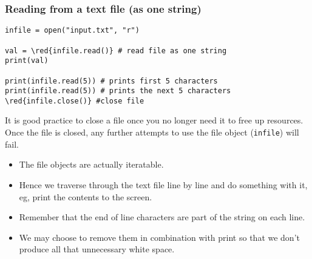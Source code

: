 \documentclass[xcolor=svgnames]{beamer}
\newenvironment{FVerbatim}
 {\VerbatimEnvironment
  \begin{center}
  \begin{lrbox}{\FVerbBox}
  \begin{BVerbatim}}
 {\end{BVerbatim}
  \end{lrbox}
  \fbox{\usebox{\FVerbBox}}
  \end{center}}
\newcommand{\red}[1]{\textcolor{red}{#1}}
\newcommand{\nl}{\\[1em]}
\newcommand{\ft}[1]{\frametitle{#1}}
\begin{document}
\begin{frame}[fragile]\ft{Reading from a text file (as one string)}
 \begin{Verbatim}[commandchars=\\\{\}, frame=single]
infile = open("input.txt", "r") 

val = \red{infile.read()} # read file as one string
print(val)

print(infile.read(5)) # prints first 5 characters
print(infile.read(5)) # prints the next 5 characters
\red{infile.close()} #close file
\end{Verbatim}
It is good practice to close a file once you no longer need it to free up resources.  Once the file is closed, any further attempts to use the file object ({\tt infile}) will fail. 
\end{frame}






\begin{frame}
\begin{itemize}
\item The file objects are actually iteratable.\nl
\item Hence we traverse through the text file line by line and do something with it, eg, print the contents to the screen.\nl
\item Remember that the end of line characters are part of the string on each line. \nl
\item We may choose to remove them in combination with print so that we don't produce all that unnecessary white space.  
\end{itemize}

\end{frame}
\end{document}
